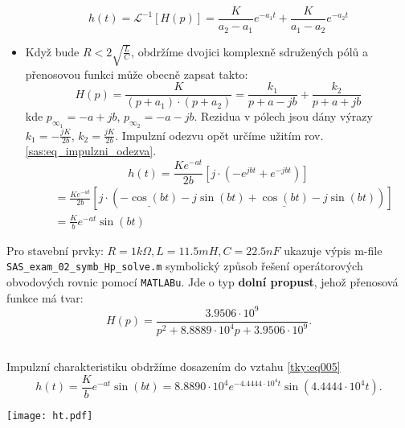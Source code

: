 \begin{example}
\begin{itemize}
\begin{equation}
            h(t)=\mathcal{L}^{-1}[H(p)]=\frac{K}{a_2-a_1}e^{-a_1t}+\frac{K}{a_1-a_2}e^{-a_2t}
          \end{equation}
    \item Když bude $R<2\sqrt{\frac{L}{C}}$, obdržíme dvojici komplexně sdružených pólů a
          pře\-no\-so\-vou funkci může obecně zapsat takto:
          \begin{equation}\label{sas:eq_ht2}
            H(p)=\frac{K}{(p+a_1)\cdot(p+a_2)}=\frac{k_1}{p+a-jb}+\frac{k_2}{p+a+jb}
          \end{equation}
          kde $p_{\infty_1}=-a+jb$, $p_{\infty_2}=-a-jb$. Rezidua v pólech jsou dány výrazy
          $k_1=-\frac{jK}{2b}$, $k_2=\frac{jK}{2b}$. Impulzní odezvu opět určíme užitím rov.
          \ref{sas:eq_impulzni_odezva}.
          \begin{equation*}
            h(t) = \frac{Ke^{-at}}{2b}\left[j\cdot\left(-e^{jbt}+e^{-jbt}\right)\right]
          \end{equation*}
          \begin{align}
            \,  &= \frac{Ke^{-at}}{2b}\left[j\cdot
            \left(\underline{-\cos(bt)}-j\sin(bt)+
            \underline{\cos(bt)}-j\sin(bt)\right)\right]                        \nonumber\\
            \,  &= \frac{K}{b}e^{-at}\sin(bt)                                   \label{tky:eq005}
          \end{align}
  \end{itemize}
  
  Pro stavební prvky: $R=1k\Omega, L=11.5mH, C=22.5nF$ ukazuje výpis m-file  
  \texttt{SAS\_exam\_02\_symb\_Hp\_solve.m} symbolický způsob řešení operátorových
  ob\-vo\-do\-vých rovnic pomocí \texttt{MATLABu}. Jde o typ \textbf{dolní propust}, jehož
  přenosová funkce má tvar: $$H(p)= \frac{3.9506\cdot10^9}{p^2+8.8889\cdot10^4p+3.9506\cdot10^9}.$$
  
  \begin{lstlisting}[caption=TKY\_exam\_02\_symb\_Hp\_solve.m]
  \end{lstlisting}
  Impulzní charakteristiku obdržíme dosazením do vztahu \ref{tky:eq005}
  $$h(t)=\frac{K}{b}e^{-at}\sin(bt) 
  =8.8890\cdot10^4e^{-4.4444\cdot10^4t}\sin(4.4444\cdot10^4t).$$
  
    {\centering
    \texttt{[image: ht.pdf]}
    \label{SAS:fig_ImpChar}
    \par}
  

\end{example}
